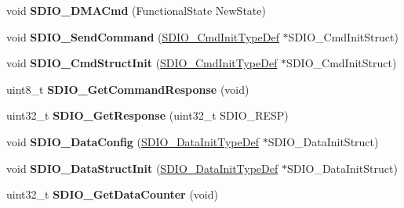 \begin{DoxyCompactItemize}
\item 
\hypertarget{group__SDIO__Exported__Functions_gad36fde5ec0ce0c2089b9d971c2271e6e}{
void {\bfseries SDIO\_\-DMACmd} (FunctionalState NewState)}
\label{group__SDIO__Exported__Functions_gad36fde5ec0ce0c2089b9d971c2271e6e}

\item 
\hypertarget{group__SDIO__Exported__Functions_ga7117d2f702703f6c0a66bc07707cab23}{
void {\bfseries SDIO\_\-SendCommand} (\hyperlink{structSDIO__CmdInitTypeDef}{SDIO\_\-CmdInitTypeDef} $\ast$SDIO\_\-CmdInitStruct)}
\label{group__SDIO__Exported__Functions_ga7117d2f702703f6c0a66bc07707cab23}

\item 
\hypertarget{group__SDIO__Exported__Functions_ga09d9e89f49c87c82aec79c97b7068e24}{
void {\bfseries SDIO\_\-CmdStructInit} (\hyperlink{structSDIO__CmdInitTypeDef}{SDIO\_\-CmdInitTypeDef} $\ast$SDIO\_\-CmdInitStruct)}
\label{group__SDIO__Exported__Functions_ga09d9e89f49c87c82aec79c97b7068e24}

\item 
\hypertarget{group__SDIO__Exported__Functions_ga9badf271c818e09da301d715c4ad0e5b}{
uint8\_\-t {\bfseries SDIO\_\-GetCommandResponse} (void)}
\label{group__SDIO__Exported__Functions_ga9badf271c818e09da301d715c4ad0e5b}

\item 
\hypertarget{group__SDIO__Exported__Functions_ga5c1e859511840e8cca6a9a768bce220b}{
uint32\_\-t {\bfseries SDIO\_\-GetResponse} (uint32\_\-t SDIO\_\-RESP)}
\label{group__SDIO__Exported__Functions_ga5c1e859511840e8cca6a9a768bce220b}

\item 
\hypertarget{group__SDIO__Exported__Functions_gad65d896ae919683585bda44a1e2afae4}{
void {\bfseries SDIO\_\-DataConfig} (\hyperlink{structSDIO__DataInitTypeDef}{SDIO\_\-DataInitTypeDef} $\ast$SDIO\_\-DataInitStruct)}
\label{group__SDIO__Exported__Functions_gad65d896ae919683585bda44a1e2afae4}

\item 
\hypertarget{group__SDIO__Exported__Functions_gaa83209c09e921521aca2587fb5b22ea2}{
void {\bfseries SDIO\_\-DataStructInit} (\hyperlink{structSDIO__DataInitTypeDef}{SDIO\_\-DataInitTypeDef} $\ast$SDIO\_\-DataInitStruct)}
\label{group__SDIO__Exported__Functions_gaa83209c09e921521aca2587fb5b22ea2}

\item 
\hypertarget{group__SDIO__Exported__Functions_ga7a28aaa2c25a9a5a8db1f49b0e8c9d0a}{
uint32\_\-t {\bfseries SDIO\_\-GetDataCounter} (void)}
\label{group__SDIO__Exported__Functions_ga7a28aaa2c25a9a5a8db1f49b0e8c9d0a}


\end{DoxyCompactItemize}
